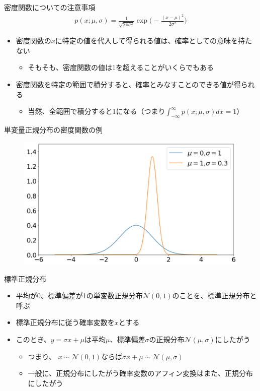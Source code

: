 \documentclass[aspectratio=169,unicode,dvipdfmx,14pt]{beamer}
\begin{document}
\begin{frame}{密度関数についての注意事項}
\begin{align}
p(x;\mu,\sigma) = \frac{1}{\sqrt{2\pi\sigma^2}}\exp\Big( - \frac{(x - \mu)^2}{2\sigma^2} \Big)
\end{align}
\begin{itemize}
\item 密度関数の$x$に特定の値を代入して得られる値は、確率としての意味を持たない
\begin{itemize}
\item そもそも、密度関数の値は1を超えることがいくらでもある
\end{itemize}
\item 密度関数を特定の範囲で積分すると、確率とみなすことのできる値が得られる
\begin{itemize}
\item 当然、全範囲で積分すると1になる（つまり$\int_{-\infty}^\infty p(x;\mu,\sigma)dx = 1$）
\end{itemize}
\end{itemize}
\end{frame}

\begin{frame}{単変量正規分布の密度関数の例}
\begin{figure}[b]
\begin{center}
\includegraphics[scale=0.45]{normal_distribution_2.png}
\end{center}
\end{figure}
\end{frame}

\begin{frame}{標準正規分布}
\begin{itemize}
\item 平均が0、標準偏差が1の単変数正規分布$\mathcal{N}(0,1)$のことを、標準正規分布と呼ぶ
\item 標準正規分布に従う確率変数を$x$とする
\item このとき、$y=\sigma x+\mu$は平均$\mu$、標準偏差$\sigma$の正規分布$\mathcal{N}(\mu,\sigma)$にしたがう
\begin{itemize}
\item つまり、 $x\sim\mathcal{N}(0,1)$ならば$\sigma x + \mu\sim\mathcal{N}(\mu,\sigma)$
\item 一般に、正規分布にしたがう確率変数のアフィン変換はまた、正規分布にしたがう
\end{itemize}
\end{itemize}
\end{frame}
\end{document}

